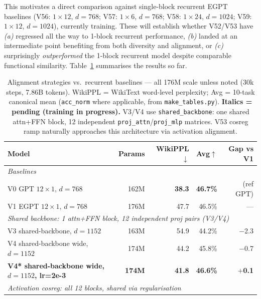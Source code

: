 This motivates a direct comparison against single-block recurrent EGPT baselines
(V56: $1{\times}12$, $d{=}768$; V57: $1{\times}6$, $d{=}768$;
V58: $1{\times}24$, $d{=}1024$; V59: $1{\times}12$, $d{=}1024$),
currently training.
These will establish whether V52/V53 have
\emph{(a)} regressed all the way to 1-block recurrent performance,
\emph{(b)} landed at an intermediate point benefiting from both diversity
and alignment, or \emph{(c)} surprisingly \emph{outperformed} the
1-block recurrent model despite comparable functional similarity.
Table~\ref{tab:recurrent_baselines} summarises the results so far.

\begin{table}[ht]
\centering
\caption{%
  Alignment strategies vs.\ recurrent baselines — all 176M scale unless noted
  (30k steps, 7.86B tokens).
  WikiPPL = WikiText word-level perplexity; Avg = 10-task canonical mean
  (\texttt{acc\_norm} where applicable, from \texttt{make\_tables.py}).
  \textbf{Italics = pending (training in progress).}
  V3/V4 use \texttt{shared\_backbone}: one shared attn+FFN block,
  12 independent \texttt{proj\_attn}/\texttt{proj\_mlp} matrices.
  V53 cosreg ramp naturally approaches this architecture via activation alignment.
}
\label{tab:recurrent_baselines}
\small
\begin{tabular}{lrrrr}
\toprule
\textbf{Model} & \textbf{Params} & \textbf{WikiPPL$\downarrow$} & \textbf{Avg$\uparrow$} & \textbf{Gap vs V1} \\
\midrule
\multicolumn{5}{l}{\textit{Baselines}} \\
\midrule
V0  GPT $12{\times}1$, $d{=}768$       & 162M & \textbf{38.3} & \textbf{46.7\%} & (ref GPT) \\
V1  EGPT $12{\times}1$, $d{=}768$      & 176M & 47.7          & 46.5\%          & ---       \\
\midrule
\multicolumn{5}{l}{\textit{Shared backbone: 1 attn+FFN block, 12 independent proj pairs (V3/V4)}} \\
\midrule
V3  shared-backbone, $d{=}1152$              & 163M & 54.9 & 44.2\% & $-$2.3 \\
V4  shared-backbone wide, $d{=}1152$         & 174M & 44.2 & 45.8\% & $-$0.7 \\
\textbf{V4* shared-backbone wide, $d{=}1152$, lr=2e-3} & \textbf{174M} & \textbf{41.8} & \textbf{46.6\%} & \textbf{$+$0.1} \\
\midrule
\multicolumn{5}{l}{\textit{Activation cosreg: all 12 blocks, shared via regularisation}} \\
\midrule

\end{tabular}
\end{table}
